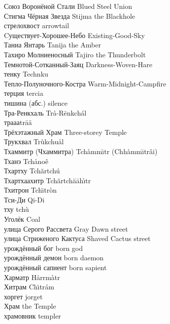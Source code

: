 Союз Воронёной Стали \hfill Blued Steel Union\\
Стигма Чёрная Звезда \hfill Stijma the Blackhole\\
стрелохвост \hfill arrowtail\\
Cуществует-Хорошее-Небо \hfill Existing-Good-Sky\\
Таниа Янтарь \hfill Tanija the Amber\\
Тахиро Молниеносный \hfill Tajiro the Thunderbolt\\
Темнотой-Сотканный-Заяц \hfill Darkness-Woven-Hare\\
тенку \hfill Technku\\
Тепло-Полуночного-Костра \hfill Warm-Midnight-Campfire\\
терция \hfill tercia\\
тишина (абс.) \hfill silence\\
Тра-Ренкхаль \hfill Tr\r{a}-R\={e}nkch\'{a}l\\
трааа\ldotst \hfill tr\={a}\"{a}\ldotst \\
Трёхэтажный Храм \hfill Three-storey Temple\\
Трукхвал \hfill Tr\`{u}kchu\r{a}l\\
Тхаммитр (Чхаммитра) \hfill Tch\`{a}mm\={\i}tr (Chh\`{a}mm\={\i}tr\^{a}i)\\
Тханэ \hfill Tch\r{a}no\^{e}\\
Тхартху \hfill Tch\~{a}rtch\'{u}\\
Тхартхаахитр \hfill Tch\~{a}rtch\"{a}\={a}h\r{\i}tr\\
Тхитрон \hfill Tch\"{\i}tr\`{o}n\\
Тси-Ди \hfill Qi-Di\\
тху \hfill tch\`{u}\\
Уголёк \hfill Coal\\
улица Серого Рассвета \hfill Gray Dawn street\\
улица Стриженого Кактуса \hfill Shaved Cactus street\\
урождённый бог \hfill born god\\
урождённый демон \hfill born daemon\\
урождённый сапиент \hfill born sapient\\
Харматр \hfill H\r{a}rrm\`{a}tr\\
Хитрам \hfill Ch\"{\i}tr\'{a}m\\
хоргет \hfill jorget\\
Храм \hfill the Temple\\
храмовник \hfill templer\\
